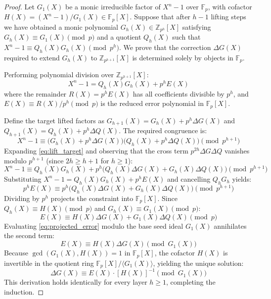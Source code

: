 \documentclass[10pt,a4paper]{amsart}
\begin{document}
\begin{proof}
Let $G_1(X)$ be a monic irreducible factor of $X^n-1$ over $\mathbb{F}_p$, with cofactor $H(X) = (X^n-1)/G_1(X) \in \mathbb{F}_p[X]$. Suppose that after $h-1$ lifting steps we have obtained a monic polynomial $G_h(X) \in \mathbb{Z}_{p^h}[X]$ satisfying $G_h(X) \equiv G_1(X) \pmod p$ and a quotient $Q_h(X)$ such that $X^n - 1 \equiv Q_h(X) G_h(X) \pmod{p^h}$. We prove that the correction $\Delta G(X)$ required to extend $G_h(X)$ to $\mathbb{Z}_{p^{h+1}}[X]$ is determined solely by objects in $\mathbb{F}_p$.

Performing polynomial division over $\mathbb{Z}_{p^{h+1}}[X]$:
\begin{equation}
    X^n - 1 = Q_h(X) G_h(X) + p^h E(X)
\end{equation}
where the remainder $R(X) = p^h E(X)$ has all coefficients divisible by $p^h$, and $E(X) \equiv R(X)/p^h \pmod p$ is the reduced error polynomial in $\mathbb{F}_p[X]$.

Define the target lifted factors as $G_{h+1}(X) = G_h(X) + p^h \Delta G(X)$ and $Q_{h+1}(X) = Q_h(X) + p^h \Delta Q(X)$. The required congruence is:
\begin{equation} \label{eq:lift_target}
    X^n - 1 \equiv \big(G_h(X) + p^h \Delta G(X)\big)\big(Q_h(X) + p^h \Delta Q(X)\big) \pmod{p^{h+1}}
\end{equation}
Expanding \eqref{eq:lift_target} and observing that the cross term $p^{2h} \Delta G \Delta Q$ vanishes modulo $p^{h+1}$ (since $2h \geq h+1$ for $h \geq 1$):
\begin{equation} \label{eq:lift_expanded}
    X^n - 1 \equiv Q_h(X) G_h(X) + p^h \big(Q_h(X) \Delta G(X) + G_h(X) \Delta Q(X)\big) \pmod{p^{h+1}}
\end{equation}
Substituting $X^n - 1 = Q_h(X) G_h(X) + p^h E(X)$ and cancelling $Q_h G_h$ yields:
\begin{equation}
    p^h E(X) \equiv p^h \big(Q_h(X) \Delta G(X) + G_h(X) \Delta Q(X)\big) \pmod{p^{h+1}}
\end{equation}
Dividing by $p^h$ projects the constraint into $\mathbb{F}_p[X]$. Since $Q_h(X) \equiv H(X) \pmod p$ and $G_h(X) \equiv G_1(X) \pmod p$:
\begin{equation} \label{eq:projected_error}
    E(X) \equiv H(X) \Delta G(X) + G_1(X) \Delta Q(X) \pmod p
\end{equation}
Evaluating \eqref{eq:projected_error} modulo the base seed ideal $G_1(X)$ annihilates the second term:
\begin{equation}
    E(X) \equiv H(X) \Delta G(X) \pmod{G_1(X)}
\end{equation}
Because $\gcd(G_1(X), H(X)) = 1$ in $\mathbb{F}_p[X]$, the cofactor $H(X)$ is invertible in the quotient ring $\mathbb{F}_p[X]/\langle G_1(X) \rangle$, yielding the unique solution:
\begin{equation}
    \Delta G(X) \equiv E(X) \cdot [H(X)]^{-1} \pmod{G_1(X)}
\end{equation}
This derivation holds identically for every layer $h \geq 1$, completing the induction.
\end{proof}
\end{document}
